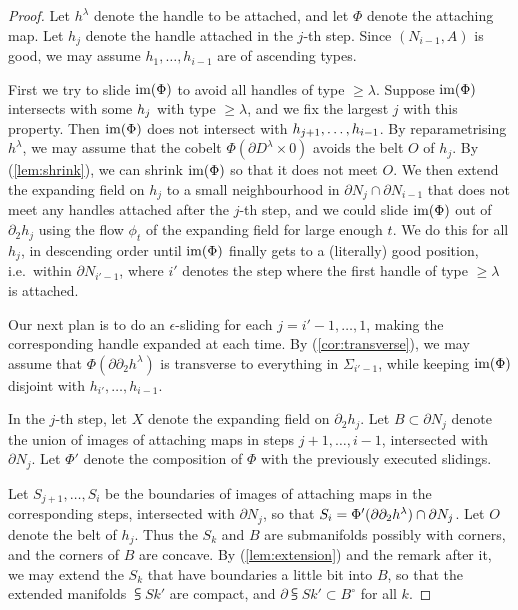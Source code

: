 \begin{proof}
    Let $h^\lambda$ denote the handle to be attached,
    and let $\Phi$ denote the attaching map.
    Let $h_j$ denote the handle attached in the $j$-th step.
    Since $(N_{i-1},A)$ is good, we may assume $h_1,\dotsc,h_{i-1}$ are of ascending types.
    
    First we try to slide $\operatorname{im}(\Phi)$ to avoid all handles of type $\geq\lambda$.
    Suppose $\operatorname{im}(\Phi)$ intersects with some $h_{\smash{j}}$ with type $\geq\lambda$,
    and we fix the largest $j$ with this property.
    Then $\operatorname{im}(\Phi)$ does not intersect with $h_{\smash{j+1}},\dotsc,h_{i-1}$.
    By reparametrising $h^\lambda$,
    we may assume that the cobelt $\Phi(\partial D^\lambda\times0)$ avoids the belt $O$ of $h_j$.
    By (\ref{lem:shrink}), we can shrink $\operatorname{im}(\Phi)$
    so that it does not meet $O$.
    We then extend the expanding field on $h_j$ to a small neighbourhood
    in $\partial N_j\cap\partial N_{i-1}$
    that does not meet any handles attached after the $j$-th step,
    and we could slide $\operatorname{im}(\Phi)$ out of $\partial_2h_j$
    using the flow $\phi_t$ of the expanding field for large enough $t$.
    We do this for all $h_j$, in descending order
    until $\operatorname{im}(\Phi)$ finally gets to a (literally) good position,
    i.e.\ within $\partial N_{i'-1}$, where
    $i'$ denotes the step where the first handle of type $\geq\lambda$ is attached.
    
    Our next plan is to do an $\epsilon$-sliding for each $j=i'-1,\dotsc,1$,
    making the corresponding handle expanded at each time.
    By (\ref{cor:transverse}), we may assume that
    $\Phi(\partial\partial_2h^{\lambda})$ is transverse to
    everything in $\Sigma_{i'-1}$,
    while keeping $\operatorname{im}(\Phi)$ disjoint with $h_{i'},\dotsc,h_{i-1}$.
    
    In the $j$-th step,
    let $X$ denote the expanding field on $\partial_2h_j$.
    Let $B\subset\partial N_j$ denote the union of images of attaching maps in steps $j+1,\dotsc,i-1$,
    intersected with $\partial N_j$.
    Let $\Phi'$ denote the composition of $\Phi$ with the previously executed slidings.
    
    Let $S_{j+1},\dotsc,S_i$
    be the boundaries of images of attaching maps
    in the corresponding steps, intersected with $\partial N_j$,
    so that $S_i=\Phi'(\partial\partial_2h^{\smash{\lambda}})\cap\partial N_j$.
    Let $O$ denote the belt of $h_j$.
    Thus the $S_k$ and $B$ are submanifolds possibly with corners,
    and the corners of $B$ are concave.
    By (\ref{lem:extension}) and the remark after it,
    we may extend the $S_k$ that have boundaries a little bit into $B$,
    so that the extended manifolds $\subsup Sk\prime$ are compact,
    and $\partial\subsup Sk\prime\subset B^\circ$ for all $k$.
    

\end{proof}

